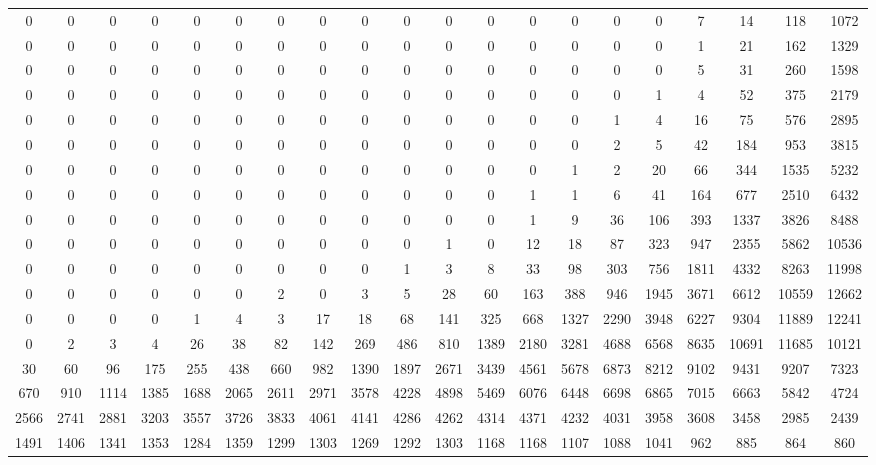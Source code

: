  \begin{tabular}{ | * {20}{c} | } 
0 & 0 & 0 & 0 & 0 & 0 & 0 & 0 & 0 & 0 & 0 & 0 & 0 & 0 & 0 & 0 & 7 & 14 & 118 & 1072 \\ 
0 & 0 & 0 & 0 & 0 & 0 & 0 & 0 & 0 & 0 & 0 & 0 & 0 & 0 & 0 & 0 & 1 & 21 & 162 & 1329 \\ 
0 & 0 & 0 & 0 & 0 & 0 & 0 & 0 & 0 & 0 & 0 & 0 & 0 & 0 & 0 & 0 & 5 & 31 & 260 & 1598 \\ 
0 & 0 & 0 & 0 & 0 & 0 & 0 & 0 & 0 & 0 & 0 & 0 & 0 & 0 & 0 & 1 & 4 & 52 & 375 & 2179 \\ 
0 & 0 & 0 & 0 & 0 & 0 & 0 & 0 & 0 & 0 & 0 & 0 & 0 & 0 & 1 & 4 & 16 & 75 & 576 & 2895 \\ 
0 & 0 & 0 & 0 & 0 & 0 & 0 & 0 & 0 & 0 & 0 & 0 & 0 & 0 & 2 & 5 & 42 & 184 & 953 & 3815 \\ 
0 & 0 & 0 & 0 & 0 & 0 & 0 & 0 & 0 & 0 & 0 & 0 & 0 & 1 & 2 & 20 & 66 & 344 & 1535 & 5232 \\ 
0 & 0 & 0 & 0 & 0 & 0 & 0 & 0 & 0 & 0 & 0 & 0 & 1 & 1 & 6 & 41 & 164 & 677 & 2510 & 6432 \\ 
0 & 0 & 0 & 0 & 0 & 0 & 0 & 0 & 0 & 0 & 0 & 0 & 1 & 9 & 36 & 106 & 393 & 1337 & 3826 & 8488 \\ 
0 & 0 & 0 & 0 & 0 & 0 & 0 & 0 & 0 & 0 & 1 & 0 & 12 & 18 & 87 & 323 & 947 & 2355 & 5862 & 10536 \\ 
0 & 0 & 0 & 0 & 0 & 0 & 0 & 0 & 0 & 1 & 3 & 8 & 33 & 98 & 303 & 756 & 1811 & 4332 & 8263 & 11998 \\ 
0 & 0 & 0 & 0 & 0 & 0 & 2 & 0 & 3 & 5 & 28 & 60 & 163 & 388 & 946 & 1945 & 3671 & 6612 & 10559 & 12662 \\ 
0 & 0 & 0 & 0 & 1 & 4 & 3 & 17 & 18 & 68 & 141 & 325 & 668 & 1327 & 2290 & 3948 & 6227 & 9304 & 11889 & 12241 \\ 
0 & 2 & 3 & 4 & 26 & 38 & 82 & 142 & 269 & 486 & 810 & 1389 & 2180 & 3281 & 4688 & 6568 & 8635 & 10691 & 11685 & 10121 \\ 
30 & 60 & 96 & 175 & 255 & 438 & 660 & 982 & 1390 & 1897 & 2671 & 3439 & 4561 & 5678 & 6873 & 8212 & 9102 & 9431 & 9207 & 7323 \\ 
670 & 910 & 1114 & 1385 & 1688 & 2065 & 2611 & 2971 & 3578 & 4228 & 4898 & 5469 & 6076 & 6448 & 6698 & 6865 & 7015 & 6663 & 5842 & 4724 \\ 
2566 & 2741 & 2881 & 3203 & 3557 & 3726 & 3833 & 4061 & 4141 & 4286 & 4262 & 4314 & 4371 & 4232 & 4031 & 3958 & 3608 & 3458 & 2985 & 2439 \\ 
1491 & 1406 & 1341 & 1353 & 1284 & 1359 & 1299 & 1303 & 1269 & 1292 & 1303 & 1168 & 1168 & 1107 & 1088 & 1041 & 962 & 885 & 864 & 860 \\ 
 \end{tabular} 
